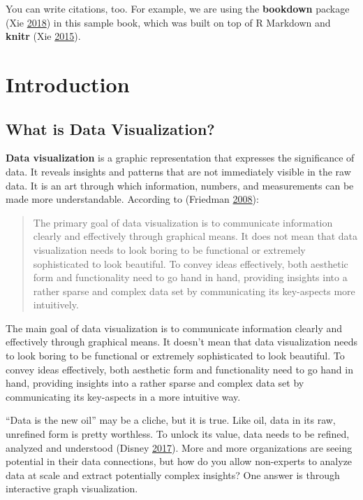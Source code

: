 \documentclass[]{book}
\begin{document}
You can write citations, too. For example, we are using the
\textbf{bookdown} package (Xie \protect\hyperlink{ref-R-bookdown}{2018})
in this sample book, which was built on top of R Markdown and
\textbf{knitr} (Xie \protect\hyperlink{ref-xie2015}{2015}).

\chapter{Introduction}\label{introduction}

\section{What is Data Visualization?}\label{what-is-data-visualization}

\textbf{Data visualization} is a graphic representation that expresses
the significance of data. It reveals insights and patterns that are not
immediately visible in the raw data. It is an art through which
information, numbers, and measurements can be made more understandable.
According to (Friedman \protect\hyperlink{ref-viz}{2008}):

\begin{quote}
The primary goal of data visualization is to communicate information
clearly and effectively through graphical means. It does not mean that
data visualization needs to look boring to be functional or extremely
sophisticated to look beautiful. To convey ideas effectively, both
aesthetic form and functionality need to go hand in hand, providing
insights into a rather sparse and complex data set by communicating its
key-aspects more intuitively.
\end{quote}

The main goal of data visualization is to communicate information
clearly and effectively through graphical means. It doesn't mean that
data visualization needs to look boring to be functional or extremely
sophisticated to look beautiful. To convey ideas effectively, both
aesthetic form and functionality need to go hand in hand, providing
insights into a rather sparse and complex data set by communicating its
key-aspects in a more intuitive way.

``Data is the new oil'' may be a cliche, but it is true. Like oil, data
in its raw, unrefined form is pretty worthless. To unlock its value,
data needs to be refined, analyzed and understood (Disney
\protect\hyperlink{ref-lawfraud}{2017}). More and more organizations are
seeing potential in their data connections, but how do you allow
non-experts to analyze data at scale and extract potentially complex
insights? One answer is through interactive graph visualization.
\end{document}
